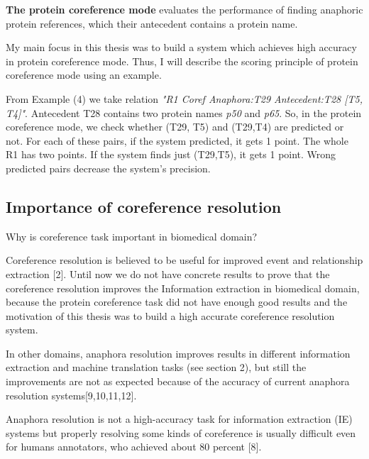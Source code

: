 \textbf{The protein coreference mode} evaluates the performance of finding anaphoric protein references, which their antecedent contains a protein name. 

My main focus in this thesis was to build a system which achieves high accuracy in protein coreference mode. Thus, I will describe the scoring principle of protein coreference mode using an example.

From Example (4) we take relation \emph{"R1 Coref Anaphora:T29 Antecedent:T28 [T5, T4]"}. Antecedent T28 contains two protein names \emph{p50} and \emph{p65}. So, in the protein coreference mode, we check whether (T29, T5) and (T29,T4) are predicted or not. For each of these pairs, if the system predicted, it gets 1 point. The whole R1 has two points. If the system finds just (T29,T5), it gets 1 point. Wrong predicted pairs decrease the system's precision. 

\subsection{Importance of coreference resolution}

Why is coreference task important in biomedical domain?

Coreference resolution is believed to be useful for improved event and relationship extraction [2]. Until now we do not have concrete results to prove that the coreference resolution improves the Information extraction in biomedical domain, because the protein coreference task did not have enough good results and the motivation of this thesis was to build a high accurate coreference resolution system.
 
In other domains, anaphora resolution improves results in different information extraction and machine translation tasks (see section 2), but still the improvements are not as expected because of the accuracy of current anaphora resolution systems[9,10,11,12].
 
Anaphora resolution is not a high-accuracy task for information extraction (IE) systems but properly resolving some kinds of coreference is usually difficult even for humans annotators, who achieved about 80 percent [8].


